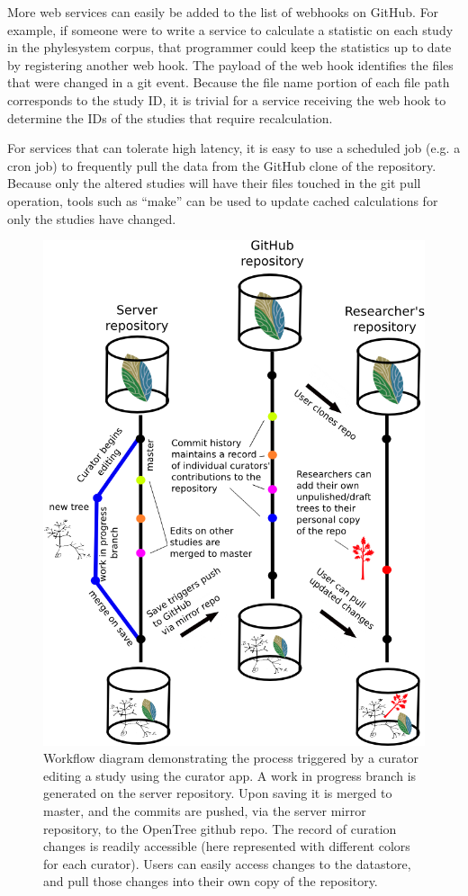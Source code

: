 \documentclass{bioinfo}
\newcommand{\ps}{phylesystem\xspace}
\begin{document}
\begin{methods}
More web services can easily be added to the list of webhooks on GitHub.
For example, if someone were to write a service to calculate a statistic on each study in the \ps corpus, that
    programmer could keep the statistics up to date by registering another web hook.
The payload of the web hook identifies the files that were changed in a git event.
Because the file name portion of each file path corresponds to the study ID, it is trivial for a service
    receiving the web hook to determine the IDs of the studies that require recalculation.

For services that can tolerate high latency, it is easy to use a scheduled job (e.g. a cron job) to 
    frequently pull the data from the GitHub clone of the repository.
Because only the altered studies will have their files touched in the git pull operation, tools such
    as ``make'' can be used to update cached calculations for only the studies have changed.
\end{methods}
    
\begin{figure}
\includegraphics[scale=0.4]{workflow.png}
 \caption{Workflow diagram demonstrating the process triggered by a curator editing a study using the curator app.
 A work in progress branch is generated on the server repository. Upon saving it is merged to master, and the commits are pushed, 
 via the server mirror repository, to the OpenTree github repo.
 The record of curation changes is readily accessible (here represented with different colors for each curator).
 Users can easily access changes to the datastore, and pull those changes into their own copy of the repository.
 }
\label{workflow}
\end{figure}
\end{document}
